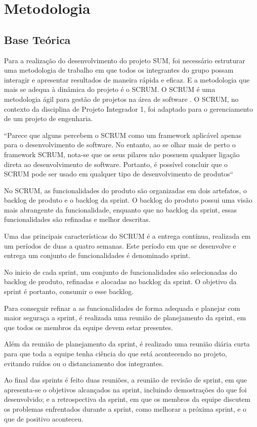 \section{Metodologia}
\subsection{Base Teórica}
 Para a realização do desenvolvimento do projeto SUM, foi necessário estruturar uma metodologia de trabalho em que todos os integrantes do grupo possam interagir e apresentar resultados de maneira rápida e eficaz. E a metodologia que mais se adequa à dinâmica do projeto é o SCRUM. O SCRUM é uma metodologia ágil para gestão de projetos na área de software \cite{devagil}. O SCRUM, no contexto da disciplina de Projeto Integrador 1, foi adaptado para o gerenciamento de um projeto de engenharia.

  “Parece que alguns percebem o SCRUM como um framework aplicável apenas para o desenvolvimento de software. No entanto, ao se olhar mais de perto o framework SCRUM, nota-se que os seus pilares não possuem qualquer ligação direta ao desenvolvimento de software. Portanto, é possível concluir que o SCRUM pode ser usado em qualquer tipo de desenvolvimento de produtos“ \cite{scrumineng}

  No SCRUM, as funcionalidades do produto são organizadas em dois artefatos, o backlog de produto e o backlog da sprint. O backlog do produto possui uma visão mais abrangente da funcionalidade, enquanto que no backlog da sprint, essas funcionalidades são refinadas e melhor descritas.

  Uma das principais características do SCRUM é a entrega contínua, realizada em um períodos de duas a quatro semanas. Este período em que se desenvolve e entrega um conjunto de funcionalidades é denominado sprint.

  No inicio de cada sprint, um conjunto de funcionalidades são selecionadas do backlog de produto, refinadas e alocadas no backlog da sprint. O objetivo da sprint é portanto, consumir o esse backlog.

  Para conseguir refinar a as funcionalidades de forma adequada e planejar com maior seguraça a sprint, é realizada uma reunião de planejamento da sprint, em que todos os membros da equipe devem estar presentes.

  Além da reunião de planejamento da sprint, é realizado uma reunião diária curta para que toda a equipe tenha ciência do que está acontecendo no projeto, evitando ruídos ou o distanciamento dos integrantes.

  Ao final das sprints é feito duas reuniões, a reunião de revisão de sprint, em que apresenta-se o objetivos alcançados na sprint, incluindo demostrações do que foi desenvolvido; e a retrospectiva da sprint, em que os membros da equipe discutem os problemas enfrentados durante a sprint, como melhorar a próxima sprint, e o que de positivo aconteceu.
